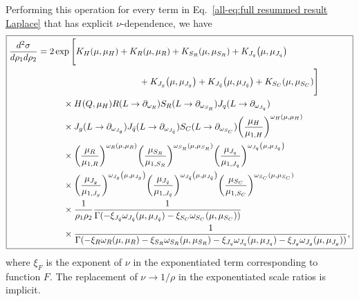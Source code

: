 \documentclass[../thesis.tex]{subfiles}
\begin{document}
	Performing this operation for every term in Eq.~\ref{all-eq:full resummed result Laplace} that has explicit $\nu$-dependence, we have
	\begin{equation}\label{all-eq:full resummed result}
	\boxed{
	\begin{aligned}
		\frac{d^2\sigma}{d\rho_1 d\rho_2} &= 2 \exp\Bigg[K_H(\mu, \mu_H)  + K_R(\mu, \mu_R) + K_{S_R}(\mu, \mu_{S_R}) + K_{J_q}\qty(\mu, \mu_{J_q})  \\
		&\hspace{4cm}+ K_{J_g}\qty(\mu, \mu_{J_g}) + K_{J_{\bar q}}\qty(\mu, \mu_{J_{\bar q}}) + K_{S_C}(\mu, \mu_{S_C})  \Bigg] \\
		&\hspace{1cm}\times H(Q, \mu_H) R(L \to \partial_{\omega_R}) S_R(L \to \partial_{\omega_{S_R}}) J_q(L \to \partial_{\omega_{J_q}}) \\
		&\hspace{1cm}\times J_g(L \to \partial_{\omega_{J_g}}) J_{\bar q}(L \to \partial_{\omega_{J_{\bar q}}}) S_C(L \to \partial_{\omega_{S_C}}) \qty(\frac{\mu_H}{\mu_{1, H}})^{\omega_H(\mu, \mu_H)} \\
		&\hspace{1cm}\times  \qty(\frac{\mu_R}{\mu_{1, R}})^{\omega_R(\mu, \mu_R)} \qty(\frac{\mu_{S_R}}{\mu_{1, {S_R}}})^{\omega_{S_R}(\mu, \mu_{S_R})} \qty(\frac{\mu_{J_q}}{\mu_{1, J_q}})^{\omega_{J_q}\qty(\mu, \mu_{J_q})} \\
		&\hspace{1cm}\times \qty(\frac{\mu_{J_g}}{\mu_{1, J_g}})^{\omega_{J_g}\qty(\mu, \mu_{J_g})} \qty(\frac{\mu_{J_{\bar q}}}{\mu_{1, J_{\bar q}}})^{\omega_{J_{\bar q}}\qty(\mu, \mu_{J_{\bar q}})} \qty(\frac{\mu_{S_C}}{\mu_{1, S_C}})^{\omega_{S_C}(\mu, \mu_{S_C})} \\
		&\hspace{1cm}\times \frac{1}{\rho_1 \rho_2} \frac{1}{\Gamma(-\xi_{J_{\bar q}} \omega_{J_{\bar q}}(\mu, \mu_{J_{\bar q}}) - \xi_{S_C} \omega_{S_C}(\mu, \mu_{S_C}))}   \\
		&\hspace{1cm}\times \frac{1}{\Gamma(-\xi_R \omega_R(\mu, \mu_R) - \xi_{S_R} \omega_{S_R}(\mu, \mu_{S_R}) - \xi_{J_q} \omega_{J_q}(\mu, \mu_{J_q}) - \xi_{J_g} \omega_{J_g}(\mu, \mu_{J_g}))},
	\end{aligned}
	}
	\end{equation}
	where $\xi_F$ is the exponent of $\nu$ in the exponentiated term corresponding to function $F$. The replacement of $\nu \to 1/\rho$ in the exponentiated scale ratios is implicit.
	
\end{document}

